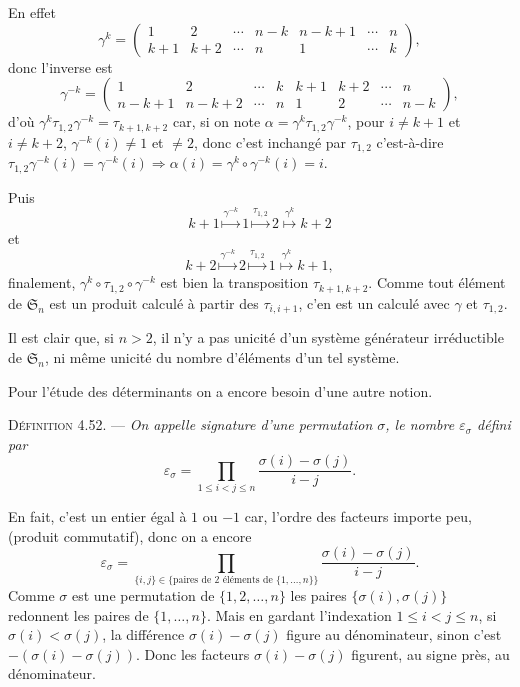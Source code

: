 En effet
\[
\gamma^k=
\begin{pmatrix}
1&2&\cdots&n-k&n-k+1&\cdots&n\\
k+1&k+2&\cdots&n&1&\cdots&k
\end{pmatrix},
\]
donc l'inverse est
\[
\gamma^{-k}=
\begin{pmatrix}
1&2&\cdots&k&k+1&k+2&\cdots&n\\
n-k+1&n-k+2&\cdots&n&1&2&\cdots&n-k
\end{pmatrix},
\]
d'où $\gamma^k\tau_{1,2}\gamma^{-k}=\tau_{k+1,k+2}$ car, si on note $\alpha=\gamma^k\tau_{1,2}\gamma^{-k}$, pour $i\ne k+1$ et $i\ne k+2$, $\gamma^{-k}(i)\ne1$ et $\ne2$, donc c'est inchangé par $\tau_{1,2}$ c'est-à-dire $\tau_{1,2}\gamma^{-k}(i)=\gamma^{-k}(i)\Rightarrow\alpha(i)=\gamma^k\circ\gamma^{-k}(i)=i$.

Puis
\[
k+1\mathrel{\mathop{\longmapsto}\limits^{\gamma^{-k}}}1
\mathrel{\mathop{\longmapsto}\limits^{\tau_{1,2}}}2
\mathrel{\mathop{\longmapsto}\limits^{\gamma^k}}k+2
\]
et
\[
k+2\mathrel{\mathop{\longmapsto}\limits^{\gamma^{-k}}}2
\mathrel{\mathop{\longmapsto}\limits^{\tau_{1,2}}}1
\mathrel{\mathop{\longmapsto}\limits^{\gamma^k}}k+1,
\]
finalement, $\gamma^k\circ\tau_{1,2}\circ\gamma^{-k}$ est bien la transposition $\tau_{k+1,k+2}$. Comme tout élément de $\mathfrak S_n$ est un produit calculé à partir des $\tau_{i,i+1}$, c'en est un calculé avec $\gamma$ et $\tau_{1,2}$.

Il est clair que, si $n>2$, il n'y a pas unicité d'un système générateur irréductible de $\mathfrak S_n$, ni même unicité du nombre d'éléments d'un tel système.

Pour l'étude des déterminants on a encore besoin d'une autre notion.

\medskip\noindent\textsc{Définition 4.52.} --- \emph{On appelle signature d'une permutation $\sigma$, le nombre $\varepsilon_\sigma$ défini par
\[
\varepsilon_\sigma=\prod_{1\le i<j\le n}\frac{\sigma(i)-\sigma(j)}{i-j}.
\]}

En fait, c'est un entier égal à $1$ ou $-1$ car, l'ordre des facteurs importe peu, (produit commutatif), donc on a encore
\[
\varepsilon_\sigma=
\prod_{\{i,j\}\in\{\text{paires de 2 éléments de }\{1,\ldots,n\}\}}
\frac{\sigma(i)-\sigma(j)}{i-j}.
\]
Comme $\sigma$ est une permutation de $\{1,2,\ldots,n\}$ les paires $\{\sigma(i),\sigma(j)\}$ redonnent les paires de $\{1,\ldots,n\}$. Mais en gardant l'indexation $1\le i<j\le n$, si $\sigma(i)<\sigma(j)$, la différence $\sigma(i)-\sigma(j)$ figure au dénominateur, sinon c'est $-(\sigma(i)-\sigma(j))$. Donc les facteurs $\sigma(i)-\sigma(j)$ figurent, au signe près, au dénominateur.

